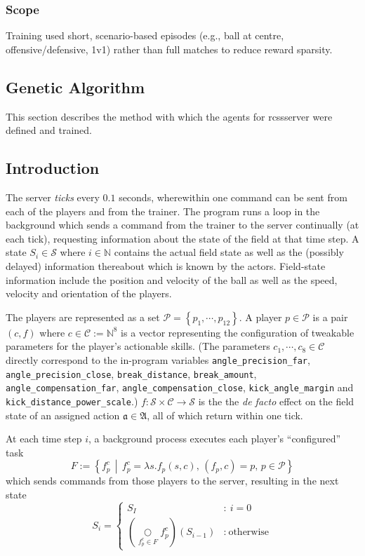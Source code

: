 \subsubsection{Scope}
Training used short, scenario-based episodes (e.g., ball at centre, offensive/defensive, 1v1) rather than full matches to reduce reward sparsity.

\subsection{Genetic Algorithm}

This section describes the method with which the agents for rcssserver were defined and trained.

\subsection{Introduction}
The server \textit{ticks} every \(0.1\) seconds, wherewithin one command can be sent from each of the players and from the trainer. The program runs a loop in the background which sends a command from the trainer to the server continually (at each tick), requesting information about the state of the field at that time step. A state \(S_i \in \mathcal{S}\) where \(i \in \mathbb{N}\) contains the actual field state as well as the (possibly delayed) information thereabout which is known by the actors. Field-state information include the position and velocity of the ball as well as the speed, velocity and orientation of the players.

The players are represented as a set \(\mathcal{P}=\left\{p_1,\cdots,p_{12}\right\}\). A player \(p \in \mathcal{P}\) is a pair \((c, f)\) where \(c \in \mathcal{C} := \mathbb{N}^8\) is a vector representing the configuration of tweakable parameters for the player's actionable skills. (The parameters \(c_1,\cdots,c_8\in \mathcal{C}\) directly correspond to the in-program variables
\texttt{angle\_precision\_far}, \texttt{angle\_precision\_close}, \texttt{break\_distance}, \texttt{break\_amount}, \texttt{angle\_compensation\_far}, \texttt{angle\_compensation\_close}, \texttt{kick\_angle\_margin} and \texttt{kick\_distance\_power\_scale}.) \(f : \mathcal{S}\times \mathcal{C} \to \mathcal{S}\) is the the \textit{de facto} effect on the field state of an assigned action \(\mathfrak{a}\in\mathfrak{A}\), all of which return within one tick.

At each time step \(i\), a background process executes each player's ``configured'' task
\[
		F := \left\{ f_p^c \,\middle|\, f_p^c = \lambda s.f_p(s, c),\, (f_p, c) = p,\, p \in\mathcal{P} \right\}
\]
which sends commands from those players to the server, resulting in the next state
\begin{equation}
		S_{i} = \left\{
			\begin{array}{cl}
				S_I & : \ i = 0 \\
				\left(\underset{f_p^c\in F}\bigcirc f_p^c\right)(S_{i-1}) & : \ \text{otherwise}
			\end{array}
		\right. %
\end{equation}

